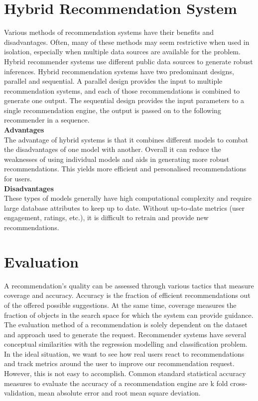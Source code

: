 \section{Hybrid Recommendation System}
Various methods of recommendation systems have their benefits and disadvantages. Often, many of these methods may seem restrictive when used in isolation, especially when multiple data sources are available for the problem. Hybrid recommender systems use different public data sources to generate robust inferences. Hybrid recommendation systems have two predominant designs, parallel and sequential. A parallel design provides the input to multiple recommendation systems, and each of those recommendations is combined to generate one output. 
The sequential design provides the input parameters to a single recommendation engine, the output is passed on to the following recommender in a sequence.
\\\textbf{Advantages}
\\The advantage of hybrid systems is that it combines different models to combat the disadvantages of one model with another. Overall it can reduce the weaknesses of using individual models and aids in generating more robust recommendations. This yields more efficient and personalised recommendations for users.
\\\textbf{Disadvantages} 
\\These types of models generally have high computational complexity and require large database attributes to keep up to date. Without up-to-date metrics (user engagement, ratings, etc.), it is difficult to retrain and provide new recommendations.

\section{Evaluation}
A recommendation's quality can be assessed through various tactics that measure coverage and accuracy. Accuracy is the fraction of efficient recommendations out of the offered possible suggestions. At the same time, coverage measures the fraction of objects in the search space for which the system can provide guidance. 
The evaluation method of a recommendation is solely dependent on the dataset and approach used to generate the request. 
Recommender systems have several conceptual similarities with the regression modelling and classification problem. 
In the ideal situation, we want to see how real users react to recommendations and track metrics around the user to improve our recommendation request. However, this is not easy to accomplish. 
Common standard statistical accuracy measures to evaluate the accuracy of a recommendation engine are k fold cross-validation, mean absolute error and root mean square deviation. 
